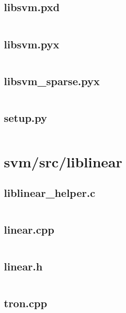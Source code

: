\documentclass{article}
\begin{document}
\subsection{libsvm.pxd}
\inputminted{cython}{/home/dufferzafar/dev/@clones/scikit-learn/sklearn/svm/libsvm.pxd}
\newpage

\subsection{libsvm.pyx}
\inputminted{cython}{/home/dufferzafar/dev/@clones/scikit-learn/sklearn/svm/libsvm.pyx}
\newpage

\subsection{libsvm\_sparse.pyx}
\inputminted{cython}{/home/dufferzafar/dev/@clones/scikit-learn/sklearn/svm/libsvm_sparse.pyx}
\newpage

\subsection{setup.py}
\inputminted{python}{/home/dufferzafar/dev/@clones/scikit-learn/sklearn/svm/setup.py}
\newpage

\section{svm/src/liblinear}

\subsection{liblinear\_helper.c}
\inputminted{c}{/home/dufferzafar/dev/@clones/scikit-learn/sklearn/svm/src/liblinear/liblinear_helper.c}
\newpage

\subsection{linear.cpp}
\inputminted{cpp}{/home/dufferzafar/dev/@clones/scikit-learn/sklearn/svm/src/liblinear/linear.cpp}
\newpage

\subsection{linear.h}
\inputminted{c}{/home/dufferzafar/dev/@clones/scikit-learn/sklearn/svm/src/liblinear/linear.h}
\newpage

\subsection{tron.cpp}
\inputminted{cpp}{/home/dufferzafar/dev/@clones/scikit-learn/sklearn/svm/src/liblinear/tron.cpp}
\newpage
\end{document}
